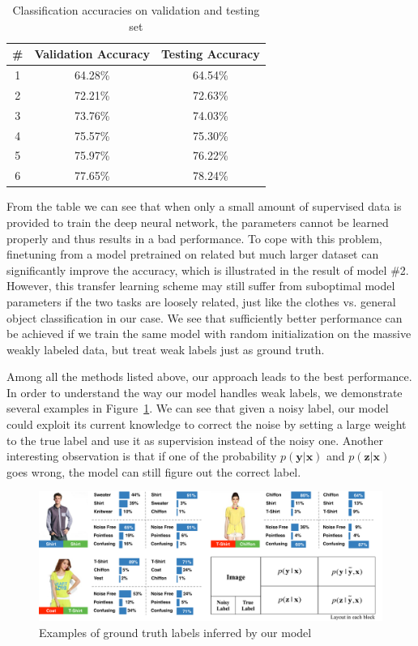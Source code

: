 \documentclass[10pt,twocolumn,letterpaper]{article}
\def\vec{\mathbf}
\begin{document}
\begin{table}
\begin{center}
\begin{tabular}{c|c|c}
\hline
\# & Validation Accuracy & Testing Accuracy \\
\hline\hline
1 & 64.28\% & 64.54\% \\
\hline
2 & 72.21\% & 72.63\% \\
\hline
3 & 73.76\% & 74.03\% \\
\hline
4 & 75.57\% & 75.30\% \\
\hline
5 & 75.97\% & 76.22\% \\
\hline
6 & 77.65\% & 78.24\% \\
\hline
\end{tabular}
\end{center}
\caption{Classification accuracies on validation and testing set}
\label{tab:accuracy}
\end{table}

From the table we can see that when only a small amount of supervised data is provided to train the deep neural network, the parameters cannot be learned properly and thus results in a bad performance. To cope with this problem, finetuning from a model pretrained on related but much larger dataset can significantly improve the accuracy, which is illustrated in the result of model \#2. However, this transfer learning scheme may still suffer from suboptimal model parameters if the two tasks are loosely related, just like the clothes vs. general object classification in our case. We see that sufficiently better performance can be achieved if we train the same model with random initialization on the massive weakly labeled data, but treat weak labels just as ground truth.

Among all the methods listed above, our approach leads to the best performance. In order to understand the way our model handles weak labels, we demonstrate several examples in Figure~\ref{fig:model_output}. We can see that given a noisy label, our model could exploit its current knowledge to correct the noise by setting a large weight to the true label and use it as supervision instead of the noisy one. Another interesting observation is that if one of the probability $p(\vec{y}|\vec{x})$ and $p(\vec{z}|\vec{x})$ goes wrong, the model can still figure out the correct label.

\begin{figure}
\begin{center}
\end{center}
\includegraphics[width=1.0\linewidth]{figure/model_output.pdf}
\caption{Examples of ground truth labels inferred by our model}
\label{fig:model_output}
\end{figure}
\end{document}
